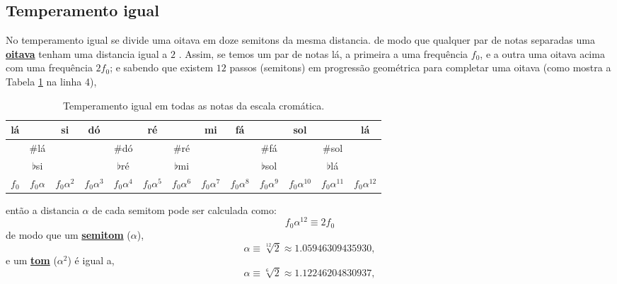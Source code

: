 \subsection{Temperamento igual}
\label{subsec:tempigual}
No  temperamento igual se divide uma oitava em doze semitons da mesma distancia.
de modo que qualquer par de notas separadas uma 
\hyperref[sec:pos:Oitava]{\textbf{oitava}} tenham uma distancia igual a $2$ \cite[pp. 835]{apel1969harvard}.
Assim, se temos um par de notas lá, a primeira a uma frequência $f_0$, 
e a outra uma oitava acima com uma frequência $2f_0$;
e sabendo que existem $12$ passos (semitons) em progressão  geométrica para completar uma oitava 
(como mostra a Tabela \ref{tab:temperamento1} na linha 4),
\begin{table}[h]
\centering
\begin{tabular}{|c|c|c|c|c|c|c|c|c|c|c|c||c|}
\hline
 lá  & ~ & si  & dó  & ~ & ré  & ~ & mi  & fá  & ~ & sol   & ~ & lá\\ \hline
 ~  & $\#$lá  & ~  & ~  & $\#$dó  & ~  & $\#$ré  & ~  & ~  & $\#$fá  & ~   & $\#$sol   & ~\\ \hline
 ~  & $\flat$si  & ~  & ~  &  $\flat$ré  & ~  &  $\flat$mi  & ~  & ~  &  $\flat$sol  & ~   &  $\flat$lá   & ~\\ \hline
$f_0$ & $f_0\alpha$ & $f_0\alpha^2$ & $f_0\alpha^3$ & $f_0\alpha^4$ & $f_0\alpha^5$ & $f_0\alpha^6$ & $f_0\alpha^7$ & $f_0\alpha^8$ & $f_0\alpha^9$ & $f_0\alpha^{10}$ & $f_0\alpha^{11}$ & $f_0\alpha^{12}$ \\ \hline
\end{tabular}
\caption{Temperamento igual em todas as notas da escala cromática.}
\label{tab:temperamento1}
\end{table}
então a distancia $\alpha$ de cada semitom pode ser calculada como:
\begin{equation}
f_0\alpha^{12}\equiv 2 f_0
\end{equation}
de modo que um \hyperref[sec:pos:Semitom]{\textbf{semitom}} ($\alpha$),
\begin{equation}
\alpha \equiv \sqrt[12]{2} \approx  1.05946309435930,
\end{equation}
e um \hyperref[sec:pos:TomDist]{\textbf{tom}} ($\alpha^2$) é igual a,
\begin{equation}
\alpha \equiv \sqrt[6]{2} \approx  1.12246204830937,
\end{equation}

